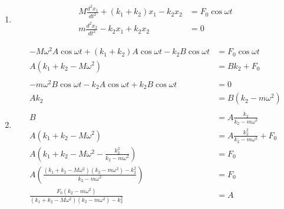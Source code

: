 \documentclass{article}
\begin{document}
\begin{enumerate}
  \item

        \begin{align*}
          M \frac{d^2 x_1}{d t^2} + (k_1 + k_2) x_1 - k_2 x_2 & = F_0 \cos \omega t \\
          m \frac{d^2 x_2}{d t^2} - k_2 x_1 + k_2 x_2         & = 0
        \end{align*}

  \item

        \begin{align*}
          -M \omega^2 A \cos \omega t + (k_1 + k_2) A \cos \omega t - k_2 B \cos \omega t               & = F_0 \cos \omega t                      \\
          A (k_1 + k_2 - M \omega^2)                                                                    & = B k_2 + F_0                            \\ \\
          -m \omega^2 B \cos \omega t - k_2 A \cos \omega t + k_2 B \cos \omega t                       & = 0                                      \\
          A k_2                                                                                         & = B (k_2 - m \omega^2)                   \\ \\
          B                                                                                             & = A \frac{k_2}{k_2 - m \omega^2}         \\
          A (k_1 + k_2 - M \omega^2)                                                                    & = A \frac{k_2^2}{k_2 - m \omega^2} + F_0 \\
          A \left( k_1 + k_2 - M \omega^2 - \frac{k_2^2}{k_2 - m \omega^2} \right)                      & = F_0                                    \\
          A \left( \frac{(k_1 + k_2 - M \omega^2) (k_2 - m \omega^2) - k_2^2}{k_2 - m \omega^2} \right) & = F_0                                    \\
          \frac{F_0 (k_2 - m \omega^2)}{(k_1 + k_2 - M \omega^2) (k_2 - m \omega^2) - k_2^2}            & = A
        \end{align*}


\end{enumerate}
\end{document}

